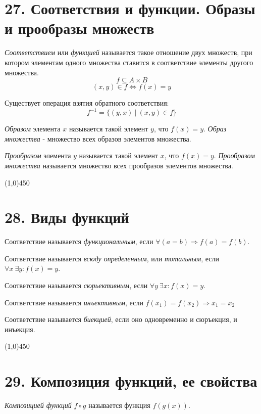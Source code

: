 \documentclass[a4paper,12pt]{article}
\begin{document}
	\section*{27. Соответствия и функции. Образы и прообразы множеств}
	\textit{Соответствием} или \textit{функцией} называется такое отношение двух множеств, при котором элементам одного множества ставится в соответствие элементы другого множества.
	\[
	f \subseteq A \times B
	\]
	\[
	(x, y) \in f \Leftrightarrow f(x) = y
	\]
	
	Существует операция взятия обратного соответствия:
	\[
	f^{-1} = \{(y, x) \ | \ (x, y) \in f \}
	\]
	
	\textit{Образом} элемента $x$ называется такой элемент $y$, что $f(x) = y$. \textit{Образ множества} - множество всех образов элементов множества.
	
	\textit{Прообразом} элемента $y$ называется такой элемент $x$, что $f(x) = y$. \textit{Прообразом множества} называется множество всех прообразов элементов множества.
	
	\begin{center}
		\line(1,0){450}
	\end{center}
	
	\section*{28. Виды функций}
	Соответствие называется \textit{функциональным}, если $\forall (a = b) \Rightarrow f(a) = f(b)$.
	
	Соответствие называется \textit{всюду определенным}, или \textit{тотальным}, если $\forall x \  \exists y: f(x) = y$.
	
	Соответствие называется \textit{сюрьективным}, если $\forall y \ \exists x: f(x) = y$.
	
	Соответствие называется \textit{инъективным}, если $f(x_1) = f(x_2) \Rightarrow x_1 = x_2$
	
	Соответствие называется \textit{биекцией}, если оно одновременно и сюръекция, и инъекция.
	
	\begin{center}
		\line(1,0){450}
	\end{center}

	\section*{29. Композиция функций, ее свойства}
	\textit{Композицией функций} $f \circ g$ называется функция $f(g(x))$.
	
\end{document}
